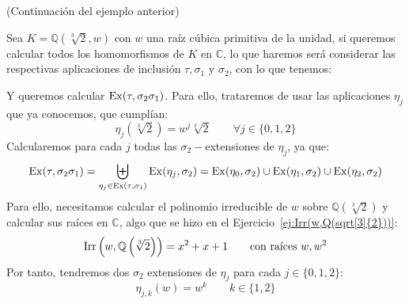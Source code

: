 \begin{ejemplo}\label{ejemplo:extension_homomorfismos}
    (Continuación del ejemplo anterior)

    \noindent
    Sea $K = \mathbb{Q}\left(\sqrt[3]{2},w\right)$ con $w$ una raíz cúbica primitiva de la unidad, si queremos calcular todos los homomorfismos de $K$ en $\mathbb{C}$, lo que haremos será considerar las respectivas aplicaciones de inclusión $\tau,\sigma_1$ y $\sigma_2$, con lo que tenemos:
    \begin{figure}[H]
        \centering
    \end{figure}
    \noindent
    Y queremos calcular $\operatorname{Ex}(\tau,\sigma_2\sigma_1)$. Para ello, trataremos de usar las aplicaciones $\eta_j$ que ya conocemos, que cumplían:
    \begin{equation*}
        \eta_j\left(\sqrt[3]{2}\right) = w^j \sqrt[3]{2} \qquad \forall j \in \{0,1,2\}
    \end{equation*}
    Calcularemos para cada $j$ todas las $\sigma_2-$extensiones de $\eta_j$, ya que:
    \begin{equation*}
        \operatorname{Ex}(\tau,\sigma_2\sigma_1) = \biguplus_{\eta_j \in  \operatorname{Ex}(\tau,\sigma_1)}\operatorname{Ex}(\eta_j, \sigma_2) = \operatorname{Ex}(\eta_0,\sigma_2) \cup \operatorname{Ex}(\eta_1, \sigma_2) \cup \operatorname{Ex}(\eta_2,\sigma_2)
    \end{equation*}
    Para ello, necesitamos calcular el polinomio irreducible de $w$ sobre $\mathbb{Q}\left(\sqrt[3]{2}\right)$ y calcular sus raíces en $\mathbb{C}$, algo que se hizo en el Ejercicio~\ref{ej:Irr(w,Q(sqrt[3]{2}))}:
    \begin{equation*}
        \operatorname{Irr}\left(w,\mathbb{Q}\left(\sqrt[3]{2}\right)\right) = x^2+x+1 \qquad \text{con raíces\ } w, w^2
    \end{equation*}
    Por tanto, tendremos dos $\sigma_2$ extensiones de $\eta_j$ para cada $j \in \{0,1,2\}$:
    \begin{equation*}
        \eta_{j,k}(w) = w^k \qquad k \in \{1,2\}
    \end{equation*}


\end{ejemplo}
